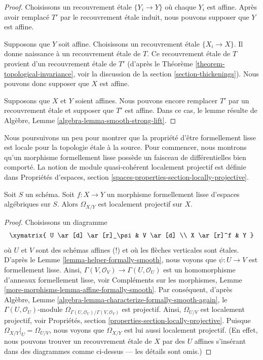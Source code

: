 \begin{proof}
Choisissons un recouvrement étale $\{Y_i \to Y\}$ où chaque $Y_i$ est affine.
Après avoir remplacé $T'$ par le recouvrement étale induit, nous pouvons supposer
que $Y$ est affine.

\medskip\noindent
Supposons que $Y$ soit affine. Choisissons un recouvrement étale $\{X_i \to X\}$.
Il donne naissance à un recouvrement étale de $T$. Ce recouvrement étale de $T$
provient d'un recouvrement étale de $T'$
(d'après le Théorème \ref{theorem-topological-invariance}, voir la
discussion de la section \ref{section-thickenings}).
Nous pouvons donc supposer que $X$ est affine.

\medskip\noindent
Supposons que $X$ et $Y$ soient affines. Nous pouvons encore remplacer
$T'$ par un recouvrement étale et supposer que $T'$ est affine. Dans ce cas, le lemme résulte de
Algèbre, Lemme \ref{algebra-lemma-smooth-strong-lift}.
\end{proof}







\noindent
Nous poursuivons un peu pour montrer que la propriété d'être formellement lisse est locale
pour la topologie étale à la source. Pour commencer, nous montrons qu'un morphisme formellement lisse possède un
faisceau de différentielles bien comporté. La notion de module quasi-cohérent
localement projectif est définie dans
Propriétés d'espaces,
section \ref{spaces-properties-section-locally-projective}.

\begin{lemma}
\label{lemma-formally-smooth-sheaf-differentials}
Soit $S$ un schéma.
Soit $f : X \to Y$ un morphisme formellement lisse d'espaces algébriques sur $S$.
Alors $\Omega_{X/Y}$ est localement projectif sur $X$.
\end{lemma}

\begin{proof}
Choisissons un diagramme
$$
\xymatrix{
U \ar[d] \ar[r]_\psi & V \ar[d] \\
X \ar[r]^f & Y
}
$$
où $U$ et $V$ sont des schémas affines (!) et où les flèches verticales sont étales.
D'après le
Lemme \ref{lemma-helper-formally-smooth},
nous voyons que $\psi : U \to V$ est formellement lisse. Ainsi,
$\Gamma(V, \mathcal{O}_V) \to \Gamma(U, \mathcal{O}_U)$ est
un homomorphisme d'anneaux formellement lisse, voir
Compléments sur les morphismes, Lemme \ref{more-morphisms-lemma-affine-formally-smooth}.
Par conséquent, d'après
Algèbre, Lemme \ref{algebra-lemma-characterize-formally-smooth-again},
le $\Gamma(U, \mathcal{O}_U)$-module
$\Omega_{\Gamma(U, \mathcal{O}_U)/\Gamma(V, \mathcal{O}_V)}$
est projectif. Ainsi, $\Omega_{U/V}$ est localement projectif, voir
Propriétés, section \ref{properties-section-locally-projective}.
Puisque $\Omega_{X/Y}|_U = \Omega_{U/V}$, nous voyons que $\Omega_{X/Y}$ est
lui aussi localement projectif. (En effet, nous pouvons trouver un recouvrement étale de
$X$ par des $U$ affines s'insérant dans des diagrammes comme ci-dessus --- les détails sont
omis.)
\end{proof}

